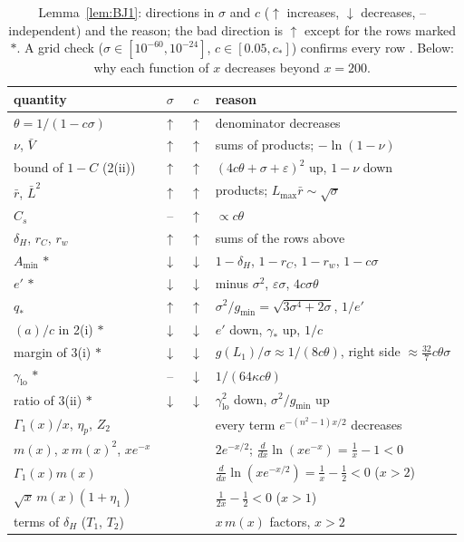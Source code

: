 \begin{table}
\caption{Lemma~\ref{lem:BJ1}: directions in $\sigma$ and $c$ ($\uparrow$ increases, $\downarrow$ decreases, -- independent) and the reason; the bad
direction is $\uparrow$ except for the rows marked $\ast$. A grid check ($\sigma\in[10^{-60},10^{-24}]$, $c\in[0.05,c_*]$) confirms every row \numst.
Below: why each function of $x$ decreases beyond $x=200$.}
\label{tab:monoBJ}
\begin{ruledtabular}
\small
\begin{tabular}{p{}ccp{}}
quantity & $\sigma$ & $c$ & reason\\ \hline
$\theta=1/(1-c\sigma)$ & $\uparrow$ & $\uparrow$ & denominator decreases\\
$\nu$, $\bar V$ & $\uparrow$ & $\uparrow$ & sums of products; $-\ln(1-\nu)$\\
bound of $1-C$ (2(ii)) & $\uparrow$ & $\uparrow$ & $(4c\theta+\sigma+\varepsilon)^2$ up, $1-\nu$ down\\
$\bar r$, $\bar L^2$ & $\uparrow$ & $\uparrow$ & products; $L_{\max}\bar r\sim\sqrt\sigma$\\
$C_s$ & -- & $\uparrow$ & $\propto c\theta$\\
$\delta_H$, $r_C$, $r_w$ & $\uparrow$ & $\uparrow$ & sums of the rows above\\
$A_{\min}$ $\ast$ & $\downarrow$ & $\downarrow$ & $1-\delta_H$, $1-r_C$, $1-r_w$, $1-c\sigma$\\
$e'$ $\ast$ & $\downarrow$ & $\downarrow$ & minus $\sigma^2$, $\varepsilon\sigma$, $4c\sigma\theta$\\
$q_*$ & $\uparrow$ & $\uparrow$ & $\sigma^2/g_{\min}=\sqrt{3\sigma^4+2\sigma}$, $1/e'$\\
$(a)/c$ in 2(i) $\ast$ & $\downarrow$ & $\downarrow$ & $e'$ down, $\gamma_*$ up, $1/c$\\
margin of 3(i) $\ast$ & $\downarrow$ & $\downarrow$ & $g(L_1)/\sigma\approx1/(8c\theta)$, right side $\approx\frac{32}7c\theta\sigma$\\
$\gamma_{\mathrm{lo}}$ $\ast$ & -- & $\downarrow$ & $1/(64\kappa c\theta)$\\
ratio of 3(ii) $\ast$ & $\downarrow$ & $\downarrow$ & $\gamma_{\mathrm{lo}}^2$ down, $\sigma^2/g_{\min}$ up\\ \hline
$\Gamma_1(x)/x$, $\eta_p$, $Z_2$ & & & every term $e^{-(n^2-1)x/2}$ decreases\\
$m(x)$, $x\,m(x)^2$, $xe^{-x}$ & & & $2e^{-x/2}$; $\frac{d}{dx}\ln(xe^{-x})=\frac1x-1<0$\\
$\Gamma_1(x)m(x)$ & & & $\frac{d}{dx}\ln(xe^{-x/2})=\frac1x-\frac12<0$ ($x>2$)\\
$\sqrt x\,m(x)(1+\eta_1)$ & & & $\frac1{2x}-\frac12<0$ ($x>1$)\\
terms of $\delta_H$ ($T_1$, $T_2$) & & & $x\,m(x)$ factors, $x>2$\\
\end{tabular}
\end{ruledtabular}
\end{table}

